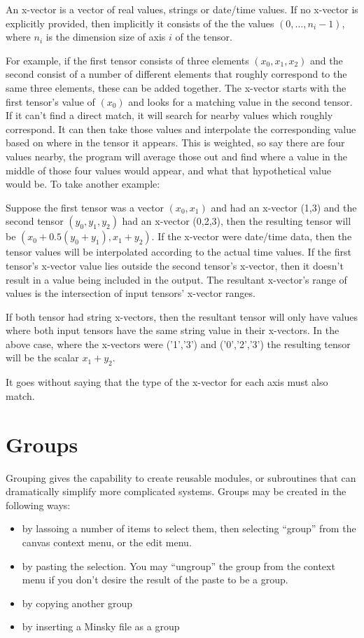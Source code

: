 An x-vector is a vector of real values, strings or date/time values. 
If no x-vector is explicitly provided, then implicitly it consists of the the values
$(0,\ldots,n_i-1)$, where $n_i$ is the dimension size of axis $i$
of the tensor.

For example, if the first tensor consists of three elements $(x_0, x_1, x_2)$
and the second consist of a number of different elements that roughly
correspond to the same three elements, these can be added together.
The x-vector starts with the first tensor's value of $(x_0)$ and looks for a
matching value in the second tensor. If it can't find a direct match, it will
search for nearby values which roughly correspond. It can then take those
values and interpolate the corresponding value based on where in the tensor
it appears. This is weighted, so say there are four values nearby, the program
will average those out and find where a value in the middle of those four
values would appear, and what that hypothetical value would be. To take
another example:

Suppose the first tensor was a vector $(x_0,x_1)$ and had an
x-vector (1,3) and the second tensor $(y_0,y_1,y_2)$ had an x-vector
(0,2,3), then the resulting tensor will be $(x_0+0.5(y_0+y_1),
x_1+y_2)$. If the x-vector were date/time data, then the tensor values
will be interpolated according to the actual time values. If the first
tensor's x-vector value lies outside the second tensor's x-vector,
then it doesn't result in a value being included in the output. The
resultant x-vector's range of values is the intersection of input
tensors' x-vector ranges.

If both tensor had string x-vectors, then the resultant tensor will
only have values where both input tensors have the same string value
in their x-vectors. In the above case, where the x-vectors were
('1','3') and ('0','2','3') the resulting tensor will be the scalar $x_1+y_2$.

It goes without saying that the type of the x-vector for each axis
must also match.

\section{Groups}\label{Group}

Grouping gives the capability to create reusable modules, or subroutines that
can dramatically simplify more complicated systems. Groups may be
created in the following ways:
\begin{itemize}
\item by lassoing a number of items to select them, then selecting
``group'' from the canvas context menu, or the edit menu.
\item by pasting the selection. You may ``ungroup'' the group from the
context menu if you don't desire the result of the paste to be a group.
\item by copying another group
\item by inserting a Minsky file as a group
\end{itemize}

